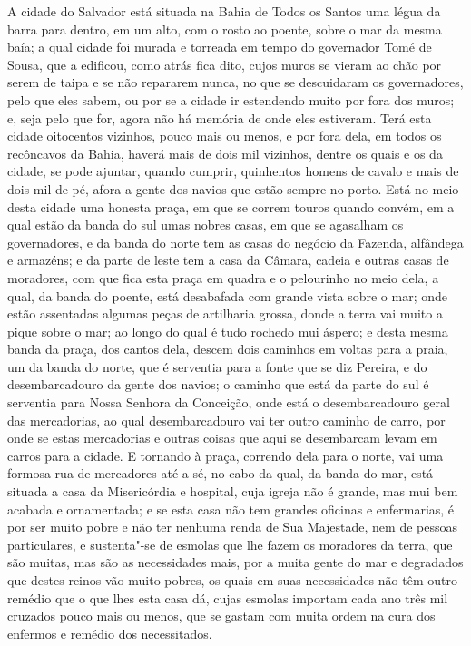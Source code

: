 A cidade do Salvador está situada na Bahia de Todos os Santos uma légua da barra para
dentro, em um alto, com o rosto ao poente, sobre o mar da mesma baía; a qual cidade foi
murada e torreada em tempo do governador Tomé de Sousa, que a edificou, como atrás fica
dito, cujos muros se vieram ao chão por serem de taipa e se não repararem nunca, no que se
descuidaram os governadores, pelo que eles sabem, ou por se a cidade ir estendendo muito
por fora dos muros; e, seja pelo que for, agora não há memória de onde eles estiveram.
Terá esta cidade oitocentos vizinhos, pouco mais ou menos, e por fora dela, em todos os
recôncavos da Bahia, haverá mais de dois mil vizinhos, dentre os quais e os da cidade, se
pode ajuntar, quando cumprir, quinhentos homens de cavalo e mais de dois mil de pé, afora
a gente dos navios que estão sempre no porto. Está no meio desta cidade uma honesta praça,
em que se correm touros quando convém, em a qual estão da banda do sul umas nobres casas,
em que se agasalham os governadores, e da banda do norte tem as casas do negócio da
Fazenda, alfândega e armazéns; e da parte de leste tem a casa da Câmara, cadeia e outras
casas de moradores, com que fica esta praça em quadra e o pelourinho no meio dela, a qual,
da banda do poente, está desabafada com grande vista sobre o mar; onde estão assentadas
algumas peças de artilharia grossa, donde a terra vai muito a pique sobre o mar; ao longo
do qual é tudo rochedo mui áspero; e desta mesma banda da praça, dos cantos dela, descem
dois caminhos em voltas para a praia, um da banda do norte, que é serventia para a fonte
que se diz Pereira, e do desembarcadouro da gente dos navios; o caminho que está da parte
do sul é serventia para Nossa Senhora da Conceição, onde está o desembarcadouro geral das
mercadorias, ao qual desembarcadouro vai ter outro caminho de carro, por onde se estas
mercadorias e outras coisas que aqui se desembarcam levam em carros para a cidade. E
tornando à praça, correndo dela para o norte, vai uma formosa rua de mercadores até a sé,
no cabo da qual, da banda do mar, está situada a casa da Misericórdia e hospital, cuja
igreja não é grande, mas mui bem acabada e ornamentada; e se esta casa não tem grandes
oficinas e enfermarias, é por ser muito pobre e não ter nenhuma renda de Sua Majestade,
nem de pessoas particulares, e sustenta"-se de esmolas que lhe fazem os moradores da terra,
que são muitas, mas são as necessidades mais, por a muita gente do mar e degradados que
destes reinos vão muito pobres, os quais em suas necessidades não têm outro remédio que o
que lhes esta casa dá, cujas esmolas importam cada ano três mil cruzados pouco mais ou
menos, que se gastam com muita ordem na cura dos enfermos e remédio dos necessitados.

